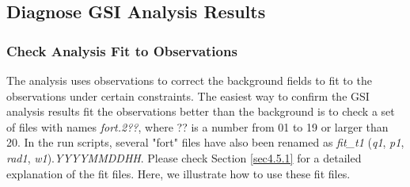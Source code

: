 \subsection{Diagnose GSI Analysis Results}

\subsubsection{Check Analysis Fit to Observations}

The analysis uses observations to correct the background fields to fit to the observations under certain constraints.  The easiest way to confirm the GSI analysis results fit the observations better than the background is to check a set of files with names \textit{fort.2??}, where ?? is a number from 01 to 19 or larger than 20.  In the run scripts, several "fort" files have also been renamed as \textit{fit\_t1} (\textit{q1}, \textit{p1}, \textit{rad1}, \textit{w1}).\textit{YYYYMMDDHH}.  Please check Section \ref{sec4.5.1} for a detailed explanation of the fit files. Here, we illustrate how to use these fit files. 

